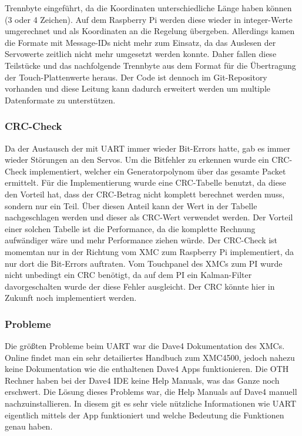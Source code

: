 \documentclass[12pt,a4paper,bibliography=totoc,listof=totoc]{scrartcl}
\begin{document}
Trennbyte eingeführt, da die Koordinaten unterschiedliche Länge haben können (3 oder 4 Zeichen). Auf dem 
Raspberry Pi werden diese wieder in integer-Werte umgerechnet und als Koordinaten an die Regelung 
übergeben.
\newline
Allerdings kamen die Formate mit Message-IDs nicht mehr zum Einsatz, da das Auslesen der Servowerte zeitlich 
nicht mehr umgesetzt werden konnte. Daher fallen diese Teilstücke und das nachfolgende Trennbyte aus dem 
Format für die Übertragung der Touch-Plattenwerte heraus. Der Code ist dennoch im Git-Repository vorhanden 
und diese Leitung kann dadurch erweitert werden um multiple Datenformate zu unterstützen.

\subsubsection{CRC-Check}
Da der Austausch der mit UART immer wieder Bit-Errors hatte, gab es immer wieder Störungen an den Servos.
Um die Bitfehler zu erkennen wurde ein CRC-Check implementiert, welcher ein Generatorpolynom über das
gesamte Packet ermittelt. Für die Implementierung wurde eine CRC-Tabelle benutzt, da diese den Vorteil hat,
dass der CRC-Betrag nicht komplett berechnet werden muss, sondern nur ein Teil. Über diesen Anteil kann 
der Wert in der Tabelle nachgeschlagen werden und dieser als CRC-Wert verwendet werden. Der Vorteil einer solchen
Tabelle ist die Performance, da die komplette Rechnung aufwändiger wäre und mehr Performance ziehen würde. Der CRC-Check ist momemtan nur in
der Richtung vom XMC zum Raspberry Pi implementiert, da nur dort die Bit-Errors auftraten. Vom Touchpanel des XMCs zum PI wurde nicht unbedingt ein CRC benötigt,
da auf dem PI ein Kalman-Filter davorgeschalten wurde der diese Fehler ausgleicht. 
Der CRC könnte hier in Zukunft noch implementiert werden.

\subsubsection{Probleme}
Die größten Probleme beim UART war die Dave4 Dokumentation des XMCs. Online findet man ein sehr detailiertes Handbuch zum 
XMC4500, jedoch nahezu keine Dokumentation wie die enthaltenen Dave4 Apps funktionieren. Die OTH Rechner haben bei der Dave4 IDE keine 
Help Manuals, was das Ganze noch erschwert. Die Lösung dieses Problems war, die Help Manuals auf Dave4 manuell 
nachzuinstallieren. In diesem git es sehr viele nützliche Informationen wie UART eigentlich mittels der App funktioniert und welche Bedeutung die Funktionen genau haben.
\end{document}
